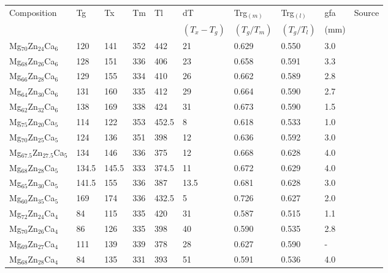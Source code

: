\documentclass[a4paper,12pt,oneside]{report}%
\begin{document}
\begin{table}[h]
	\centering
	\begin{tabular}{ l l l l l l l l l l }
		\toprule
		Composition & \acrshort{Tg} & \acrshort{Tx} & \acrshort{Tm} & \acrshort{Tl} & \acrshort{dT} & \acrshort{Trg}$_{(m)}$ & \acrshort{Trg}$_{(l)}$ & \acrshort{gfa} & Source \\ 
		& & & & & $(T_{x} - T_{g})$ & $(T_{g}/T_{m})$ & $(T_{g}/T_{l})$ & (mm) & \\ 
		\midrule
		Mg$_{70}$Zn$_{24}$Ca$_{6}$ & 120 & 141 & 352 & 442 & 21 & 0.629 & 0.550 & 3.0 & \cite{Cao2013, Cao2012} \\ 
		Mg$_{68}$Zn$_{26}$Ca$_{6}$ & 128 & 151 & 336 & 406 & 23 & 0.658 & 0.591 & 3.3 & \cite{Cao2013, Cao2012} \\ 
		Mg$_{66}$Zn$_{28}$Ca$_{6}$ & 129 & 155 & 334 & 410 & 26 & 0.662 & 0.589 & 2.8 & \cite{Cao2013, Cao2012} \\ 
		Mg$_{64}$Zn$_{30}$Ca$_{6}$ & 131 & 160 & 335 & 412 & 29 & 0.664 & 0.590 & 2.7 & \cite{Cao2013, Cao2012} \\ 
		Mg$_{62}$Zn$_{32}$Ca$_{6}$ & 138 & 169 & 338 & 424 & 31 & 0.673 & 0.590 & 1.5 & \cite{Cao2013, Cao2012} \\ 
		Mg$_{75}$Zn$_{20}$Ca$_{5}$ & 114 & 122 & 353 & 452.5 & 8 & 0.618 & 0.533 & 1.0 & \cite{Gu2005} \\ 
		Mg$_{70}$Zn$_{25}$Ca$_{5}$ & 124 & 136 & 351 & 398 & 12 & 0.636 & 0.592 & 3.0 & \cite{Gu2005, Zhou2013} \\ 
		Mg$_{67.5}$Zn$_{27.5}$Ca$_{5}$ & 134 & 146 & 336 & 375 & 12 & 0.668 & 0.628 & 4.0 & \cite{Gu2005} \\ 
		Mg$_{68}$Zn$_{28}$Ca$_{5}$ & 134.5 & 145.5 & 333 & 374.5 & 11 & 0.672 & 0.629 & 4.0 & \cite{Gu2005} \\ 
		Mg$_{65}$Zn$_{30}$Ca$_{5}$ & 141.5 & 155 & 336 & 387 & 13.5 & 0.681 & 0.628 & 3.0 & \cite{Gu2005} \\ 
		Mg$_{60}$Zn$_{35}$Ca$_{5}$ & 169 & 174 & 336 & 432.5 & 5 & 0.726 & 0.627 & 2.0 & \cite{Gu2005} \\ 
		Mg$_{72}$Zn$_{24}$Ca$_{4}$ & 84 & 115 & 335 & 420 & 31 & 0.587 & 0.515 & 1.1 & \cite{Cao2013, Cao2012} \\ 
		Mg$_{70}$Zn$_{26}$Ca$_{4}$ & 86 & 126 & 335 & 398 & 40 & 0.590 & 0.535 & 2.8 & \cite{Cao2013, Cao2012} \\ 
		Mg$_{69}$Zn$_{27}$Ca$_{4}$ & 111 & 139 & 339 & 378 & 28 & 0.627 & 0.590 & - & \cite{Wang2013} \\ 
		Mg$_{68}$Zn$_{28}$Ca$_{4}$ & 84 & 135 & 331 & 393 & 51 & 0.591 & 0.536 & 4.0 & \cite{Cao2013, Cao2012} \\ 

\end{tabular}
\end{table}
\end{document}

